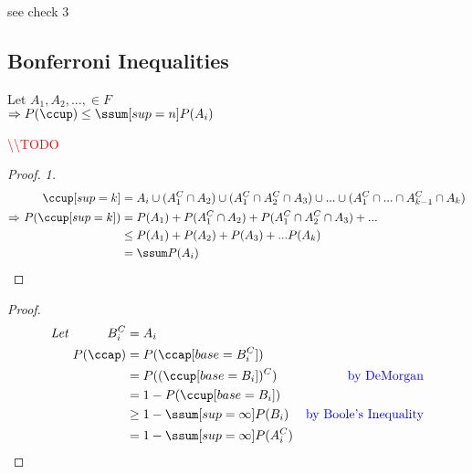 \documentclass[12pt]{article}
\newcommand{\mathcomment}[0]{\quad\color{blue}}
\newcommand{\todo}[0]{\textcolor{red}{\textbackslash\textbackslash TODO}}
\begin{document}
see check 3

\subsection{Bonferroni Inequalities}
Let $A_1, A_2, ..., \in F$ \\
$\Rightarrow P(\ccup) \le \ssum[sup=n] P(A_i)$

\todo

\begin{proof} \textit{1.}
	\begin{equation}
		\begin{alignedat}{2}
			&& \ccup[sup=k] &= A_i \cup (A^C_1 \cap A_2) \cup (A^C_1 \cap A^C_2 \cap A_3) \cup ... \cup (A^C_1 \cap ... \cap A^C_{k-1} \cap A_k) \\
			\Rightarrow \ && P(\ccup[sup=k]) &= P(A_1) + P(A^C_1 \cap A_2) + P(A^C_1 \cap A^C_2 \cap A_3) + ... \\
			&&& \le P(A_1) + P(A_2) + P(A_3) + ... P(A_k) \\
			&&&= \ssum P(A_i)
		\end{alignedat}
	\end{equation}
\end{proof}

\begin{proof}
	\begin{equation}
		\begin{alignedat}{3}
		\textit{Let } && B^C_i &= A_i &\\
		&& P(\ccap) &= P(\ccap[base=B^C_i]) &\\
		&& &= P((\ccup[base=B_i])^C) & \mathcomment \text{by DeMorgan} \\
		&& &= 1 - P(\ccup[base=B_i]) &\\
		&& & \ge 1 - \ssum[sup=\infty] P(B_i) & \mathcomment \text{by Boole's Inequality} \\
		&& &= 1 - \ssum[sup=\infty]P(A^C_i)
		\end{alignedat}
	\end{equation}
\end{proof}
\end{document}
